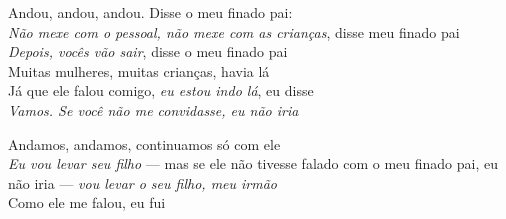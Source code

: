 \begin{linenumbers}\begingroup\raggedright
 
\noindent   Andou, andou, andou. Disse o meu finado pai:\\
  \emph{Não mexe com o pessoal, não mexe com as crianças}, disse meu finado pai\\
  \emph{Depois, vocês vão sair}, disse o meu finado pai\\
  Muitas mulheres, muitas crianças, havia lá\\
  Já que ele falou comigo, \emph{eu estou indo lá}, eu disse\\
  \emph{Vamos. Se você não me convidasse, eu não iria}
 
\end{linenumbers}\endgroup

\bigskip

\begin{linenumbers}\begingroup\raggedright
 
\noindent   Andamos, andamos, continuamos só com ele\\
  \emph{Eu vou levar seu filho} --- mas se ele não tivesse falado com o meu finado pai, eu não iria --- \emph{vou levar o seu filho, meu irmão}\\
  Como ele me falou, eu fui
 
\end{linenumbers}\endgroup

\bigskip

